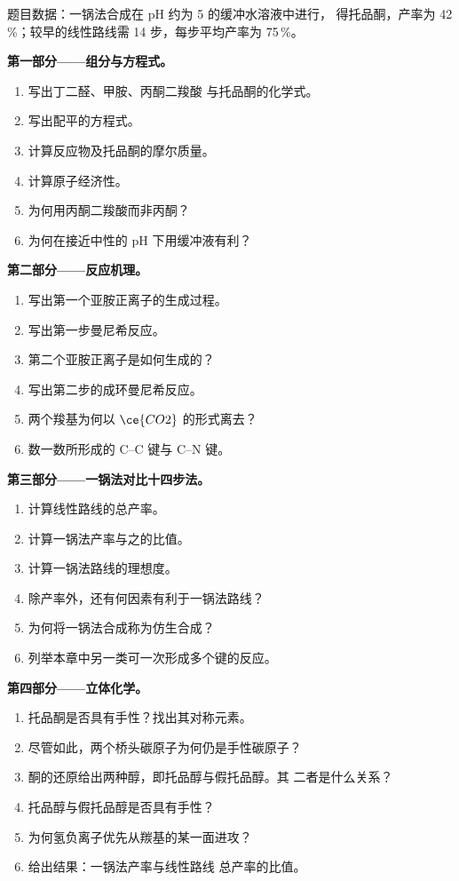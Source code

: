 \begin{problem}
\label{pb:b3:total-synthesis:1}
题目数据：一锅法合成在 pH 约为 5 的缓冲水溶液中进行，
得托品酮，产率为 42\,\%；较早的线性路线需 14 步，每步平均产率为 75\,\%。

\medskip\noindent\textbf{第一部分——组分与方程式。}
\begin{enumerate}
  \item 写出丁二醛、甲胺、丙酮二羧酸
        与托品酮的化学式。
  \item 写出配平的方程式。
  \item 计算反应物及托品酮的摩尔质量。
  \item 计算原子经济性。
  \item 为何用丙酮二羧酸而非丙酮？
  \item 为何在接近中性的 pH 下用缓冲液有利？
\end{enumerate}

\medskip\noindent\textbf{第二部分——反应机理。}
\begin{enumerate}[resume]
  \item 写出第一个亚胺正离子的生成过程。
  \item 写出第一步曼尼希反应。
  \item 第二个亚胺正离子是如何生成的？
  \item 写出第二步的成环曼尼希反应。
  \item 两个羧基为何以 $\ce{CO2}$ 的形式离去？
  \item 数一数所形成的 C--C 键与 C--N 键。
\end{enumerate}

\medskip\noindent\textbf{第三部分——一锅法对比十四步法。}
\begin{enumerate}[resume]
  \item 计算线性路线的总产率。
  \item 计算一锅法产率与之的比值。
  \item 计算一锅法路线的理想度。
  \item 除产率外，还有何因素有利于一锅法路线？
  \item 为何将一锅法合成称为仿生合成？
  \item 列举本章中另一类可一次形成多个键的反应。
\end{enumerate}

\medskip\noindent\textbf{第四部分——立体化学。}
\begin{enumerate}[resume]
  \item 托品酮是否具有手性？找出其对称元素。
  \item 尽管如此，两个桥头碳原子为何仍是手性碳原子？
  \item 酮的还原给出两种醇，即托品醇与假托品醇。其
        二者是什么关系？
  \item 托品醇与假托品醇是否具有手性？
  \item 为何氢负离子优先从羰基的某一面进攻？
  \item 给出结果：一锅法产率与线性路线
        总产率的比值。
\end{enumerate}
\end{problem}
